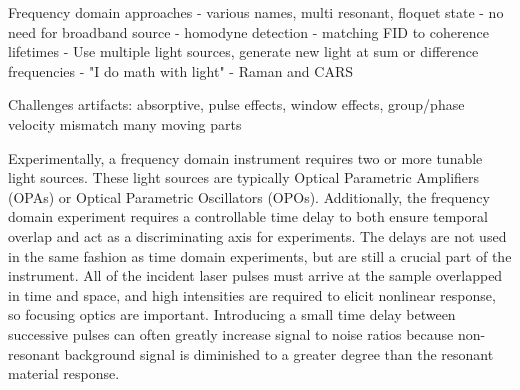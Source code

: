 Frequency domain approaches
 - various names, multi resonant, floquet state
 - no need for broadband source
 - homodyne detection
 - matching FID to coherence lifetimes
 - Use multiple light sources, generate new light at sum or difference frequencies
   - "I do math with light"
 - Raman and CARS

Challenges
 artifacts: absorptive, pulse effects, window effects, group/phase velocity mismatch
 many moving parts

Experimentally, a frequency domain instrument requires two or more tunable light sources.
These light sources are typically Optical Parametric Amplifiers (OPAs) or Optical Parametric Oscillators (OPOs).
Additionally, the frequency domain experiment requires a controllable time delay to both ensure temporal overlap and act as a discriminating axis for experiments.
The delays are not used in the same fashion as time domain experiments, but are still a crucial part of the instrument.
All of the incident laser pulses must arrive at the sample overlapped in time and space, and high intensities are required to elicit nonlinear response, so focusing optics are important.
Introducing a small time delay between successive pulses can often greatly increase signal to noise ratios because non-resonant background signal is diminished to a greater degree than the resonant material response.

\clearpage
